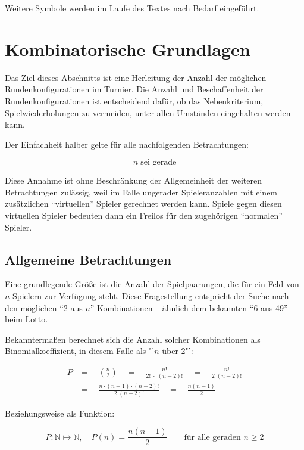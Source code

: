 \documentclass[DIV=15, 10pt]{scrartcl}
\begin{document}
Weitere Symbole werden im Laufe des Textes nach Bedarf eingeführt.

\clearpage
\section{Kombinatorische Grundlagen} 
\label{laKombinatorik}

Das Ziel dieses Abschnitts ist eine Herleitung der Anzahl der möglichen Rundenkonfigurationen im Turnier. Die Anzahl und Beschaffenheit der Rundenkonfigurationen ist entscheidend dafür, ob das Nebenkriterium, Spielwiederholungen zu vermeiden, unter allen Umständen eingehalten werden kann.

Der Einfachheit halber gelte für alle nachfolgenden Betrachtungen:

\[
n \; \text{sei gerade}
\]

Diese Annahme ist ohne Beschränkung der Allgemeinheit der weiteren Betrachtungen zulässig, weil im Falle ungerader Spieleranzahlen mit einem zusätzlichen "`virtuellen"' Spieler gerechnet werden kann. Spiele gegen diesen virtuellen Spieler bedeuten dann ein Freilos für den zugehörigen "`normalen"' Spieler.

\subsection{Allgemeine Betrachtungen}

Eine grundlegende Größe ist die Anzahl der Spielpaarungen, die für ein Feld von $n$ Spielern zur Verfügung steht. Diese Fragestellung entspricht der Suche nach den möglichen "`2-aus-$n$"'-Kombinationen -- ähnlich dem bekannten "`6-aus-49"' beim Lotto.

Bekanntermaßen berechnet sich die Anzahl solcher Kombinationen als Binomialkoeffizient, in diesem Falle als "'$n$-über-2"':

\begin{align*}
P &= \quad {{n}\choose{2}} \quad = \quad \frac{n!}{2! \; \cdot \; (n - 2)!} \quad
= \quad \frac{n!}{2 \; (n - 2)!} \nonumber \\[3mm]
&=\quad \frac{n \cdot (n - 1) \cdot (n - 2)!}{2 \; (n - 2)!} \quad = \quad
\frac{n(n-1)}{2}
\end{align*}

Beziehungsweise als Funktion:

\begin{equation}
P: \mathbb{N} \mapsto \mathbb{N}, \quad P(n) = \frac{n(n-1)}{2} \qquad
\text{für alle geraden }n \geq 2
\end{equation}
\end{document}
